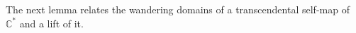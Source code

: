 \documentclass[a4paper, 12pt, reqno]{amsart}
\numberwithin{equation}{section}
\theoremstyle{plain}
\theoremstyle{definition}
\theoremstyle{remark}
\newcommand{\C}{{\mathbb{C}}}
\newcommand{\Z}{{\mathbb{Z}}}
\renewcommand{\Re}{\operatorname{Re}}
\renewcommand{\Im}{\operatorname{Im}}
\begin{document}

The next lemma relates the wandering domains of a transcendental self-map of~$\C^*$ and a lift of it.
\end{document}
